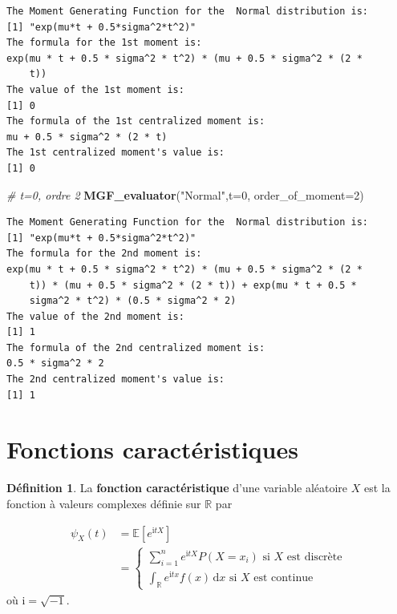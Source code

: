 \documentclass[
]{book}
\newenvironment{Shaded}{\begin{snugshade}}{\end{snugshade}}
\newcommand{\CommentTok}[1]{\textcolor[rgb]{0.56,0.35,0.01}{\textit{#1}}}
\newcommand{\DataTypeTok}[1]{\textcolor[rgb]{0.13,0.29,0.53}{#1}}
\newcommand{\DecValTok}[1]{\textcolor[rgb]{0.00,0.00,0.81}{#1}}
\newcommand{\KeywordTok}[1]{\textcolor[rgb]{0.13,0.29,0.53}{\textbf{#1}}}
\newcommand{\NormalTok}[1]{#1}
\newcommand{\StringTok}[1]{\textcolor[rgb]{0.31,0.60,0.02}{#1}}
\theoremstyle{definition}
\newtheorem{definition}{Définition}[chapter]
\theoremstyle{definition}
\theoremstyle{definition}
\theoremstyle{remark}
\begin{document}
\begin{verbatim}
The Moment Generating Function for the  Normal distribution is: 
[1] "exp(mu*t + 0.5*sigma^2*t^2)"
The formula for the 1st moment is: 
exp(mu * t + 0.5 * sigma^2 * t^2) * (mu + 0.5 * sigma^2 * (2 * 
    t))
The value of the 1st moment is: 
[1] 0
The formula of the 1st centralized moment is: 
mu + 0.5 * sigma^2 * (2 * t)
The 1st centralized moment's value is: 
[1] 0
\end{verbatim}

\begin{Shaded}
\begin{Highlighting}[]
\CommentTok{# t=0, ordre 2}
\KeywordTok{MGF_evaluator}\NormalTok{(}\StringTok{"Normal"}\NormalTok{,}\DataTypeTok{t=}\DecValTok{0}\NormalTok{, }\DataTypeTok{order_of_moment=}\DecValTok{2}\NormalTok{)}
\end{Highlighting}
\end{Shaded}

\begin{verbatim}
The Moment Generating Function for the  Normal distribution is: 
[1] "exp(mu*t + 0.5*sigma^2*t^2)"
The formula for the 2nd moment is: 
exp(mu * t + 0.5 * sigma^2 * t^2) * (mu + 0.5 * sigma^2 * (2 * 
    t)) * (mu + 0.5 * sigma^2 * (2 * t)) + exp(mu * t + 0.5 * 
    sigma^2 * t^2) * (0.5 * sigma^2 * 2)
The value of the 2nd moment is: 
[1] 1
The formula of the 2nd centralized moment is: 
0.5 * sigma^2 * 2
The 2nd centralized moment's value is: 
[1] 1
\end{verbatim}

\hypertarget{fonctions-caractuxe9ristiques}{%
\section{Fonctions caractéristiques}\label{fonctions-caractuxe9ristiques}}

\begin{definition}
\protect\hypertarget{def:unnamed-chunk-16}{}{\label{def:unnamed-chunk-16} }La \textbf{fonction caractéristique} d'une variable aléatoire \(X\) est la fonction à valeurs complexes définie sur \(\mathbb {R}\) par

\begin{align*}\psi_{X}(t)&=\mathbb{E} \left[{e} ^{\mathrm{i} tX}\right]\\
&=\begin{cases}
\displaystyle \sum_{i=1}^n {e} ^{\mathrm{i} tX }P(X=x_i) \text{ si } X \text{ est discrète}\\
\displaystyle \int_{\mathbb{R} }e^{\mathrm{i} tx} f(x)\,\mathrm{d} x \text{ si } X \text{ est continue}
\end{cases}
\end{align*}
où \(\mathrm{i}=\sqrt{-1}\).
\end{definition}
\end{document}
